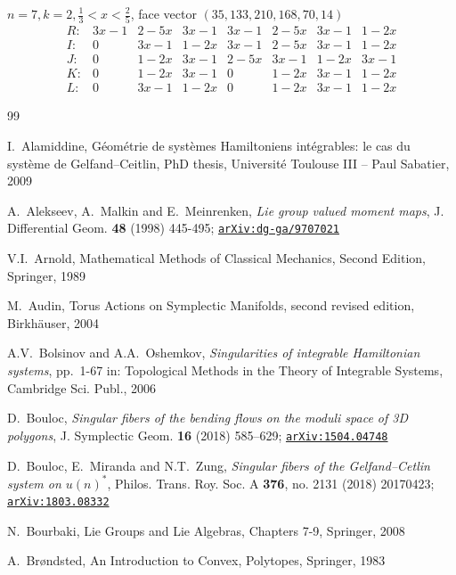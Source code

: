 \documentclass[a4paper,11pt,reqno]{amsart}
\theoremstyle{definition}
\numberwithin{equation}{section}
\begin{document}
$n=7, k=2, \tfrac13 < x < \tfrac25 $, face vector $(35, 133, 210, 168, 70, 14)$
\[
\begin{array}{cccccccc}
R:& 3 x-1 & 2-5 x & 3 x-1 & 3 x-1 & 2-5 x & 3 x-1 & 1-2 x \\
I:& 0 & 3 x-1 & 1-2 x & 3 x-1 & 2-5 x & 3 x-1 & 1-2 x \\
J:& 0 & 1-2 x & 3 x-1 & 2-5 x & 3 x-1 & 1-2 x & 3 x-1 \\
K:& 0 & 1-2 x & 3 x-1 & 0 & 1-2 x & 3 x-1 & 1-2 x \\
L:& 0 & 3 x-1 & 1-2 x & 0 & 1-2 x & 3 x-1 & 1-2 x
\end{array}
\]


\begin{thebibliography}{99}

\normalsize

I.~Alamiddine, G\'eom\'etrie de syst\`emes Hamiltoniens int\'egrables: le cas du syst\`eme de
Gelfand--Ceitlin,  PhD thesis, Universit\'e Toulouse III -- Paul Sabatier, 2009


A.~Alekseev, A.~Malkin and E.~Meinrenken,
{\it Lie group valued moment maps},
J. Differential Geom. {\bf 48} (1998) 445-495;
 \href{https://arxiv.org/abs/dg-ga/9707021}{\tt arXiv:dg-ga/9707021}


V.I.~Arnold,
Mathematical Methods of Classical Mechanics, Second Edition, Springer, 1989

M.~Audin,
Torus Actions on Symplectic Manifolds,
second revised edition, Birkh\"auser, 2004

A.V.~Bolsinov and A.A.~Oshemkov,
{\it Singularities of integrable Hamiltonian
systems}, pp.~1-67 in: Topological Methods in the Theory of Integrable Systems,
Cambridge Sci. Publ., 2006

D.~Bouloc,
{\it  Singular fibers of the bending flows on the moduli space of 3D polygons},
 J. Symplectic Geom. {\bf 16} (2018) 585–629;
\href{https://arxiv.org/abs/1505.04748}{\tt arXiv:1504.04748}

D.~Bouloc, E.~Miranda and  N.T.~Zung,
{\it Singular fibers of the Gelfand--Cetlin system on $u(n)^*$},
Philos. Trans. Roy. Soc. A {\bf 376}, no. 2131 (2018)  20170423;
\href{https://arxiv.org/abs/1803.08332}{\tt arXiv:1803.08332}

N.~Bourbaki,
Lie Groups and Lie Algebras, Chapters 7-9, Springer, 2008

A.~Br\o ndsted,
An Introduction to Convex, Polytopes, Springer, 1983



\end{thebibliography}
\end{document}
